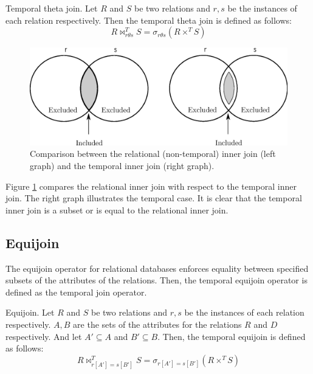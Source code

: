 \documentclass{llncs}
\renewcommand{\Join}{\bowtie}
\begin{document}
\begin{definition}
 \label{def:temporal-theta-join}
Temporal theta join. Let $R$ and $S$ be two relations and $r, s$ be the instances of each relation respectively. Then the temporal theta join is defined as follows:
\begin{equation}
 \label{eq:temporal-theta-join}
R \Join_{r \theta s}^{T} S= \sigma_{r \theta s} \left(R \times^T S \right)
\end{equation}

\end{definition}


\begin{figure}
 \includegraphics[scale=0.60]{graphs/innerjoin.eps}
\caption{\label{fi:innerjoin} Comparison between the relational (non-temporal) inner join (left graph) and the temporal inner join (right graph).}
\end{figure}



Figure \ref{fi:innerjoin} compares the relational inner join with respect to the temporal inner join. The right graph illustrates the temporal case. It is clear that the temporal inner join is a subset or is equal to the relational inner join.

\subsection{\label{subsec:Equijoin}Equijoin}
The equijoin operator for relational databases enforces equality between specified subsets of the attributes of the relations. Then, the temporal equijoin operator is defined as the temporal join operator.

\begin{definition}
 \label{def:equijoin}
Equijoin. Let $R$ and $S$ be two relations and $r, s$ be the instances of each relation respectively. $A , B$ are the sets of the attributes for the relations $R$ and $D$ respectively. And let $A' \subseteq A$ and $B' \subseteq B$. Then, the temporal equijoin is defined as follows:
\begin{equation}
 \label{eq:equijoin}
R \Join_{r\left[A' \right] = s\left[B' \right]}^{T} S =  \sigma_{r\left[A' \right] = s\left[B' \right]} \left(R \times^T S \right)
\end{equation}
\end{definition}
\end{document}
